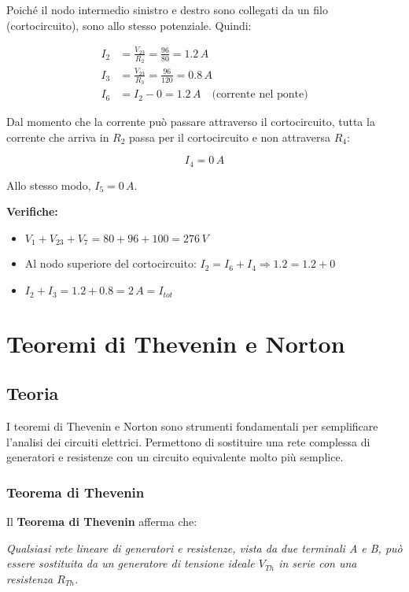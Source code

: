 \documentclass[a4paper,12pt]{article}
\begin{document}
Poiché il nodo intermedio sinistro e destro sono collegati da un filo (cortocircuito), sono allo stesso potenziale. Quindi:

\begin{align*}
I_2 &= \frac{V_{23}}{R_2} = \frac{96}{80} = 1.2\,A \\
I_3 &= \frac{V_{23}}{R_3} = \frac{96}{120} = 0.8\,A \\
I_6 &= I_2 - 0 = 1.2\,A \quad \text{(corrente nel ponte)}
\end{align*}

Dal momento che la corrente può passare attraverso il cortocircuito, tutta la corrente che arriva in $R_2$ passa per il cortocircuito e non attraversa $R_4$:

\begin{equation}
\boxed{I_4 = 0\,A}
\end{equation}

Allo stesso modo, $I_5 = 0\,A$.

\textbf{Verifiche:}
\begin{itemize}
    \item $V_1 + V_{23} + V_7 = 80 + 96 + 100 = 276\,V$ \checkmark
    \item Al nodo superiore del cortocircuito: $I_2 = I_6 + I_4 \Rightarrow 1.2 = 1.2 + 0$ \checkmark
    \item $I_2 + I_3 = 1.2 + 0.8 = 2\,A = I_{tot}$ \checkmark
\end{itemize}

\newpage
\section{Teoremi di Thevenin e Norton}

\subsection{Teoria}

I teoremi di Thevenin e Norton sono strumenti fondamentali per semplificare l'analisi dei circuiti elettrici. Permettono di sostituire una rete complessa di generatori e resistenze con un circuito equivalente molto più semplice.

\subsubsection{Teorema di Thevenin}

Il \textbf{Teorema di Thevenin} afferma che:

\textit{Qualsiasi rete lineare di generatori e resistenze, vista da due terminali A e B, può essere sostituita da un generatore di tensione ideale $V_{Th}$ in serie con una resistenza $R_{Th}$.}
\end{document}
